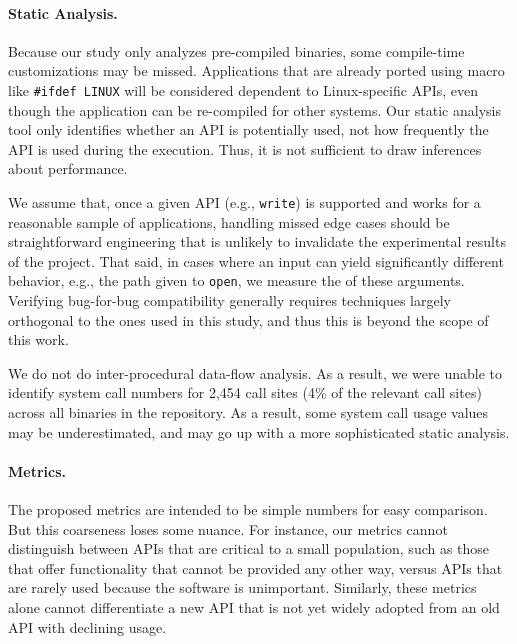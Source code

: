 \paragraph{Static Analysis.}
Because our study only analyzes pre-compiled binaries, some compile-time customizations may be missed.
Applications that are already ported using macro like {\tt \#ifdef LINUX} will be considered dependent to Linux-specific APIs,
even though the application can be re-compiled for other systems.
Our static analysis tool only identifies 
whether an API is potentially used,
not how frequently the API is used during the execution.
Thus, it is not sufficient to draw inferences about performance.



We assume that, once a given API (e.g., {\tt write}) is supported and works for a reasonable sample of applications,
handling missed edge cases should be straightforward engineering that is unlikely to invalidate the experimental results of the project.
That said, in cases where an input can yield significantly different behavior, e.g.,
the path given to {\tt open},
we measure the \usagemetric{} of these arguments.
Verifying bug-for-bug compatibility generally requires techniques largely orthogonal to the ones used in this study,
and thus this is beyond the scope of this work.

We do not do inter-procedural data-flow analysis.  As a result,
we were unable to identify system call numbers for 2,454 call sites (4\% of the
relevant call sites)
across all binaries in the repository.  As a result,
some system call usage values may be underestimated, and may go up 
with a more sophisticated static analysis.




\paragraph{Metrics.}
The proposed metrics are intended to be simple numbers for easy comparison.
But this coarseness loses some nuance. 
For instance, our metrics cannot distinguish between
APIs that are critical to a small population, such as those that offer 
functionality that cannot be provided any other way, 
versus APIs that are rarely used because the software is unimportant.
Similarly, these metrics alone cannot differentiate a new API 
that is not yet widely adopted from an old API with declining usage.


